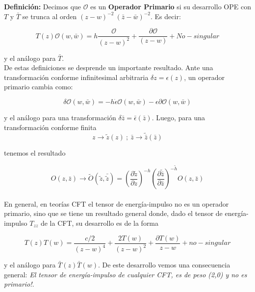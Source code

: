 \documentclass[]{article}
\begin{document}
\noindent \textbf{Definición:} Decimos que $ \mathcal{O} $ es un \textbf{Operador Primario} si su desarrollo OPE con $ T $ y $ \bar{T} $ se trunca al orden $ (z-w)^{-2} \ (\bar{z}-\bar{w})^{-2} $. Es decir:

\begin{equation}\label{primario}
T(z)\mathcal{O}(w,\bar{w})= h \frac{\mathcal{O}}{ (z-w)^2} + \frac{\partial \mathcal{O}}{ (z-w)} + No-singular
\end{equation}

\noindent y el análogo para $ \bar{T} $.\\

\noindent De estas definiciones se desprende un importante resultado. Ante una transformación conforme infinitesimal arbitraria $ \delta z = \epsilon(z) $, un operador primario cambia como: 

\begin{equation}\label{key}
\delta \mathcal{O}(w,\bar{w}) = -h\dot{\epsilon}\mathcal{O}(w,\bar{w}) - \epsilon\partial \mathcal{O}(w,\bar{w})
\end{equation}

\noindent y el análogo para una transformación $ \delta \bar{z} = \bar{\epsilon}(\bar{z}) $. Luego, para una transformación conforme finita
\begin{equation}\label{key}
z \rightarrow \tilde{z}(z) \ ; \ \bar{z} \rightarrow \tilde{\bar{z}}(\bar{z})
\end{equation}

\noindent tenemos el resultado

\begin{equation}\label{key}
O(z,\bar{z}) \rightarrow \tilde{O}(\tilde{z},\bar{\tilde{z}})= \left(\frac{\partial \tilde{z}}{\partial z}\right)^{-h} \left(\frac{\partial \tilde{\bar{z}}}{\partial \bar{z}}\right)^{-\tilde{h}} O(z,\bar{z})
\end{equation}
\\

\noindent En general, en teorías CFT el tensor de energía-impulso
no es un operador primario, sino que se tiene un resultado general donde, dado el tensor de energía-impulso $ T_{zz} $ de la CFT, su desarrollo es de la forma

\begin{equation}\label{cc}
T(z)T(w)=\frac{c/2}{(z-w)^4}+\frac{2T(w)}{(z-w)^2}+\frac{\partial T(w)}{z-w} + no-singular
\end{equation}

\noindent y el análogo para $ \bar{T}(z)\bar{T}(w) $. De este desarrollo vemos una consecuencia general: \textit{El tensor de energía-impulso de cualquier CFT, es de peso (2,0) y no es primario!}.
\end{document}
